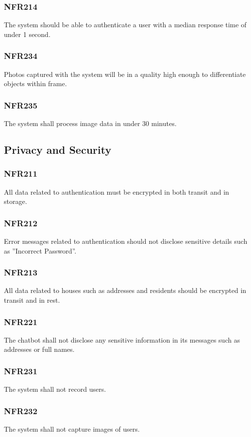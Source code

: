 \documentclass[12pt, titlepage]{article}
\begin{document}
\subsubsection{NFR214}
The system should be able to authenticate a user with a median
response time of under 1 second.
\subsubsection{NFR234} Photos captured with the system will be in a quality high
enough to differentiate objects within frame.
\subsubsection{NFR235}
The system shall process image data in under 30 minutes.

\subsection{Privacy and Security}
\subsubsection{NFR211}
All data related to authentication must be encrypted in both
transit and in storage.
\subsubsection{NFR212}
Error messages related to authentication should not disclose
sensitive details such as ”Incorrect Password”.
\subsubsection{NFR213}
All data related to houses such as addresses and residents should
be encrypted in transit and in rest.
\subsubsection{NFR221}
The chatbot shall not disclose any sensitive information in its
messages such as addresses or full names.
\subsubsection{NFR231}
The system shall not record users.
\subsubsection{NFR232}
The system shall not capture images of users.
\end{document}
